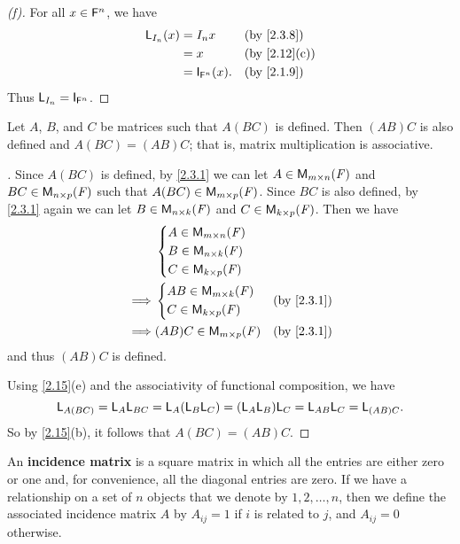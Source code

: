 \begin{proof}[(f)]
	For all \(x \in \mathsf{F}^n\), we have
	\begin{align*}
		\L_{I_n}(x) & = I_n x              &  & \by{2.3.8}   \\
		            & = x                  &  & \by{2.12}[c] \\
		            & = \IT_{\vs{F}^n}(x). &  & \by{2.1.9}
	\end{align*}
	Thus \(\L_{I_n} = \IT_{\vs{F}^n}\).
\end{proof}

\begin{thm}\label{2.16}
	Let \(A\), \(B\), and \(C\) be matrices such that \(A (BC)\) is defined.
	Then \((AB) C\) is also defined and \(A (BC) = (AB) C\);
	that is, matrix multiplication is associative.
\end{thm}

\begin{proof}[]
	Since \(A (BC)\) is defined, by \cref{2.3.1} we can let \(A \in \MS\) and \(BC \in \ms[n][p][\F]\) such that \(A (BC) \in \ms[m][p][\F]\).
	Since \(BC\) is also defined, by \cref{2.3.1} again we can let \(B \in \ms[n][k][\F]\) and \(C \in \ms[k][p][\F]\).
	Then we have
	\begin{align*}
		         & \begin{dcases}
			           A \in \MS           \\
			           B \in \ms[n][k][\F] \\
			           C \in \ms[k][p][\F]
		           \end{dcases}                      \\
		\implies & \begin{dcases}
			           AB \in \ms[m][k][\F] \\
			           C \in \ms[k][p][\F]
		           \end{dcases}  &  & \by{2.3.1}            \\
		\implies & (AB) C \in \ms[m][p][\F] &  & \by{2.3.1}
	\end{align*}
	and thus \((AB) C\) is defined.

	Using \cref{2.15}(e) and the associativity of functional composition, we have
	\[
		\mathsf{L}_{A (BC)} = \mathsf{L}_A \mathsf{L}_{BC} = \mathsf{L}_A (\mathsf{L}_B \mathsf{L}_C) = (\mathsf{L}_A \mathsf{L}_B) \mathsf{L}_C = \mathsf{L}_{AB} \mathsf{L}_C = \mathsf{L}_{(AB) C}.
	\]
	So by \cref{2.15}(b), it follows that \(A (BC) = (AB) C\).
\end{proof}

\begin{defn}\label{2.3.9}
	An \textbf{incidence matrix} is a square matrix in which all the entries are either zero or one and, for convenience, all the diagonal entries are zero.
	If we have a relationship on a set of \(n\) objects that we denote by \(1, 2, \dots, n\), then we define the associated incidence matrix \(A\) by \(A_{i j} = 1\) if \(i\) is related to \(j\), and \(A_{i j} = 0\) otherwise.
\end{defn}

